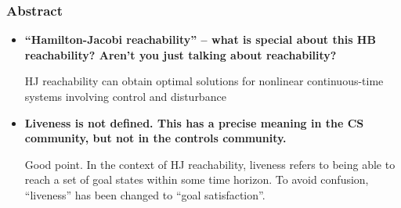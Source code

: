 \documentclass[submit]{aiaa-pretty}
\begin{document}
\subsubsection{Abstract}
\begin{itemize}
\item \textbf{“Hamilton-Jacobi reachability” – what is special about this HB reachability? Aren’t you just talking about reachability?}

HJ reachability can obtain optimal solutions for nonlinear continuous-time systems involving control and disturbance

\item \textbf{Liveness is not defined. This has a precise meaning in the CS community, but not in the controls community.}

Good point. In the context of HJ reachability, liveness refers to being able to reach a set of goal states within some time horizon. To avoid confusion, ``liveness'' has been changed to ``goal satisfaction''.
\end{itemize}
\end{document}

